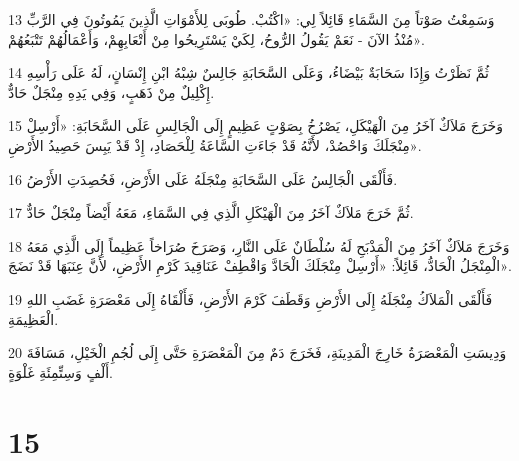 \par 13 وَسَمِعْتُ صَوْتاً مِنَ السَّمَاءِ قَائِلاً لِي: «اكْتُبْ. طُوبَى لِلأَمْوَاتِ الَّذِينَ يَمُوتُونَ فِي الرَّبِّ مُنْذُ الآنَ - نَعَمْ يَقُولُ الرُّوحُ، لِكَيْ يَسْتَرِيحُوا مِنْ أَتْعَابِهِمْ، وَأَعْمَالُهُمْ تَتْبَعُهُمْ».
\par 14 ثُمَّ نَظَرْتُ وَإِذَا سَحَابَةٌ بَيْضَاءُ، وَعَلَى السَّحَابَةِ جَالِسٌ شِبْهُ ابْنِ إِنْسَانٍ، لَهُ عَلَى رَأْسِهِ إِكْلِيلٌ مِنْ ذَهَبٍ، وَفِي يَدِهِ مِنْجَلٌ حَادٌّ.
\par 15 وَخَرَجَ مَلاَكٌ آخَرُ مِنَ الْهَيْكَلِ، يَصْرُخُ بِصَوْتٍ عَظِيمٍ إِلَى الْجَالِسِ عَلَى السَّحَابَةِ: «أَرْسِلْ مِنْجَلَكَ وَاحْصُدْ، لأَنَّهُ قَدْ جَاءَتِ السَّاعَةُ لِلْحَصَادِ، إِذْ قَدْ يَبِسَ حَصِيدُ الأَرْضِ».
\par 16 فَأَلْقَى الْجَالِسُ عَلَى السَّحَابَةِ مِنْجَلَهُ عَلَى الأَرْضِ، فَحُصِدَتِ الأَرْضُ.
\par 17 ثُمَّ خَرَجَ مَلاَكٌ آخَرُ مِنَ الْهَيْكَلِ الَّذِي فِي السَّمَاءِ، مَعَهُ أَيْضاً مِنْجَلٌ حَادٌّ.
\par 18 وَخَرَجَ مَلاَكٌ آخَرُ مِنَ الْمَذْبَحِ لَهُ سُلْطَانٌ عَلَى النَّارِ، وَصَرَخَ صُرَاخاً عَظِيماً إِلَى الَّذِي مَعَهُ الْمِنْجَلُ الْحَادُّ، قَائِلاً: «أَرْسِلْ مِنْجَلَكَ الْحَادَّ وَاقْطِفْ عَنَاقِيدَ كَرْمِ الأَرْضِ، لأَنَّ عِنَبَهَا قَدْ نَضَجَ».
\par 19 فَأَلْقَى الْمَلاَكُ مِنْجَلَهُ إِلَى الأَرْضِ وَقَطَفَ كَرْمَ الأَرْضِ، فَأَلْقَاهُ إِلَى مَعْصَرَةِ غَضَبِ اللهِ الْعَظِيمَةِ.
\par 20 وَدِيسَتِ الْمَعْصَرَةُ خَارِجَ الْمَدِينَةِ، فَخَرَجَ دَمٌ مِنَ الْمَعْصَرَةِ حَتَّى إِلَى لُجُمِ الْخَيْلِ، مَسَافَةَ أَلْفٍ وَسِتِّمِئَةِ غَلْوَةٍ.

\chapter{15}

